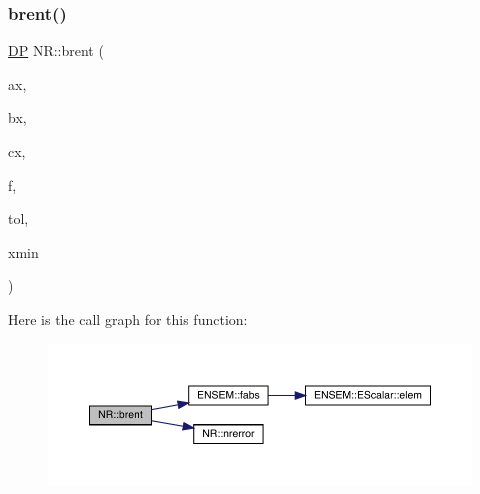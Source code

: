 \mbox{\label{namespaceNR_aff9bab8f86d05c799cb643f8d3f4727b}} 
\subsubsection{\texorpdfstring{brent()}{brent()}\hspace{0.1cm}{\footnotesize\ttfamily [1/2]}}
{\footnotesize\ttfamily \mbox{\hyperlink{namespaceNR_af6ff762dd605ff477b8e52387253a02a}{DP}} N\+R\+::brent (\begin{DoxyParamCaption}\item[{const \mbox{\hyperlink{namespaceNR_af6ff762dd605ff477b8e52387253a02a}{DP}}}]{ax,  }\item[{const \mbox{\hyperlink{namespaceNR_af6ff762dd605ff477b8e52387253a02a}{DP}}}]{bx,  }\item[{const \mbox{\hyperlink{namespaceNR_af6ff762dd605ff477b8e52387253a02a}{DP}}}]{cx,  }\item[{const \mbox{\hyperlink{classNR_1_1ScalFunc}{Scal\+Func}} \&}]{f,  }\item[{const \mbox{\hyperlink{namespaceNR_af6ff762dd605ff477b8e52387253a02a}{DP}}}]{tol,  }\item[{\mbox{\hyperlink{namespaceNR_af6ff762dd605ff477b8e52387253a02a}{DP}} \&}]{xmin }\end{DoxyParamCaption})}

Here is the call graph for this function\+:
\nopagebreak
\begin{figure}[H]
\begin{center}
\leavevmode
\includegraphics[width=350pt]{da/d46/namespaceNR_aff9bab8f86d05c799cb643f8d3f4727b_cgraph}
\end{center}
\end{figure}
\mbox{\label{namespaceNR_a949db0b9cc65ac1f2224f5c48384f58a}} 
